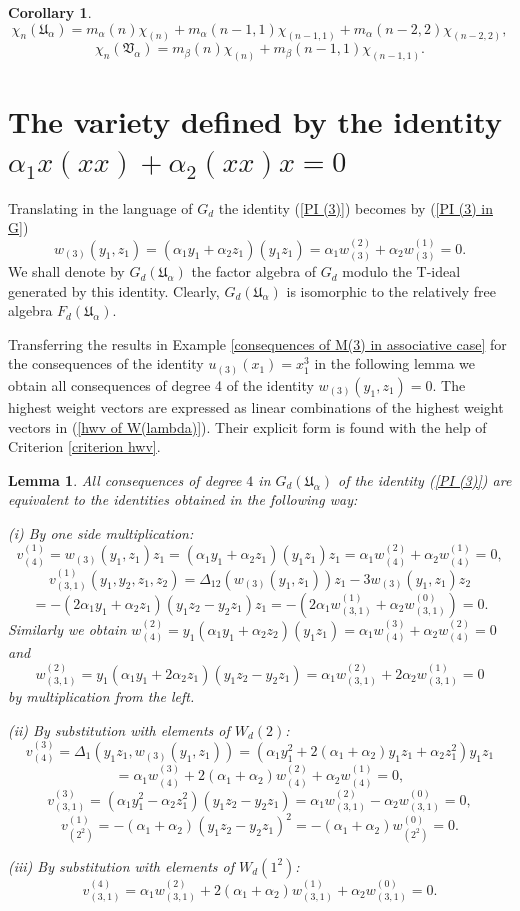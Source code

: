 \documentclass{amsart}
\newtheorem{lemma}[theorem]{Lemma}
\newtheorem{corollary}[theorem]{Corollary}
\theoremstyle{definition}
\begin{document}
\begin{corollary}\label{bounds for cocharacters}
\[
\chi_n({\mathfrak U}_{\alpha})=m_{\alpha}(n)\chi_{(n)}+m_{\alpha}(n-1,1)\chi_{(n-1,1)}+m_{\alpha}(n-2,2)\chi_{(n-2,2)},
\]
\[
\chi_n({\mathfrak V}_{\alpha})=m_{\beta}(n)\chi_{(n)}+m_{\beta}(n-1,1)\chi_{(n-1,1)}.
\]
\end{corollary}

\section{The variety defined by the identity $\alpha_1 x(xx)+\alpha_2 (xx)x=0$}
Translating in the language of $G_d$ the identity (\ref{PI (3)}) becomes by (\ref{PI (3) in G})
\[
w_{(3)}(y_1,z_1)=(\alpha_1y_1+\alpha_2z_1)(y_1z_1)=\alpha_1w_{(3)}^{(2)}+\alpha_2w_{(3)}^{(1)}=0.
\]
We shall denote by $G_d({\mathfrak U}_{\alpha})$ the factor algebra of $G_d$ modulo the T-ideal generated by this identity.
Clearly, $G_d({\mathfrak U}_{\alpha})$ is isomorphic to the relatively free algebra $F_d({\mathfrak U}_{\alpha})$.

Transferring the results in Example \ref{consequences of M(3) in associative case} for the consequences of the identity $u_{(3)}(x_1)=x_1^3$
in the following lemma we obtain all consequences of degree 4 of the identity $w_{(3)}(y_1,z_1)=0$.
The highest weight vectors are expressed as linear combinations of the highest weight vectors in (\ref{hwv of W(lambda)}).
Their explicit form is found with the help of Criterion \ref{criterion hwv}.

\begin{lemma}\label{consequences of M(3) in G}
All consequences of degree $4$ in $G_d({\mathfrak U}_{\alpha})$ of the identity {\rm (\ref{PI (3)})} are equivalent to the identities obtained in the following way:

{\rm (i)} By one side multiplication:
\[
v^{(1)}_{(4)}=w_{(3)}(y_1,z_1)z_1=(\alpha_1y_1+\alpha_2z_1)(y_1z_1)z_1=\alpha_1w_{(4)}^{(2)}+\alpha_2w_{(4)}^{(1)}=0,
\]
\[
v^{(1)}_{(3,1)}(y_1,y_2,z_1,z_2)=\Delta_{12}(w_{(3)}(y_1,z_1))z_1-3w_{(3)}(y_1,z_1)z_2
\]
\[
=-(2\alpha_1y_1+\alpha_2z_1)(y_1z_2-y_2z_1)z_1=-(2\alpha_1w_{(3,1)}^{(1)}+\alpha_2w_{(3,1)}^{(0)})=0.
\]
Similarly we obtain $w^{(2)}_{(4)}=y_1(\alpha_1y_1+\alpha_2z_2)(y_1z_1)=\alpha_1w_{(4)}^{(3)}+\alpha_2w_{(4)}^{(2)}=0$ and
\[
w^{(2)}_{(3,1)}=y_1(\alpha_1y_1+2\alpha_2z_1)(y_1z_2-y_2z_1)=\alpha_1w_{(3,1)}^{(2)}+2\alpha_2w_{(3,1)}^{(1)}=0
\]
by multiplication from the left.

{\rm (ii)} By substitution with elements of $W_d(2)$:
\[
v^{(3)}_{(4)}=\Delta_1(y_1z_1,w_{(3)}(y_1,z_1))=(\alpha_1y_1^2+2(\alpha_1+\alpha_2)y_1z_1+\alpha_2z_1^2)y_1z_1
\]
\[
=\alpha_1w_{(4)}^{(3)}+2(\alpha_1+\alpha_2)w_{(4)}^{(2)}+\alpha_2w_{(4)}^{(1)}=0,
\]
\[
v^{(3)}_{(3,1)}=(\alpha_1y_1^2-\alpha_2z_1^2)(y_1z_2-y_2z_1)=\alpha_1w_{(3,1)}^{(2)}-\alpha_2w_{(3,1)}^{(0)}=0,
\]
\[
v^{(1)}_{(2^2)}=-(\alpha_1+\alpha_2)(y_1z_2-y_2z_1)^2=-(\alpha_1+\alpha_2)w_{(2^2)}^{(0)}=0.
\]

{\rm (iii)} By substitution with elements of $W_d(1^2)$:
\[
v^{(4)}_{(3,1)}=\alpha_1w_{(3,1)}^{(2)}+2(\alpha_1+\alpha_2)w_{(3,1)}^{(1)}+\alpha_2w_{(3,1)}^{(0)}=0.
\]
\end{lemma}
\end{document}
